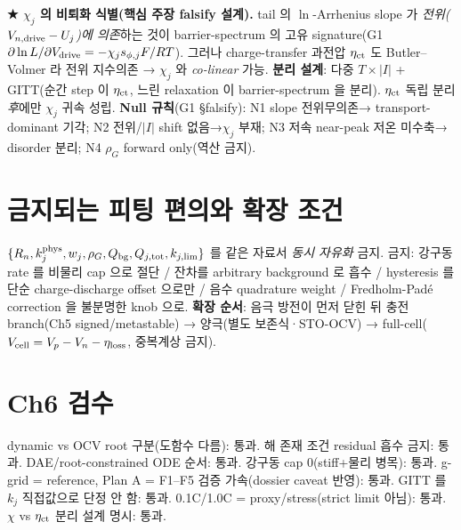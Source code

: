 \textbf{★ $\chi_j$ 의 비퇴화 식별(핵심 주장 falsify 설계).} tail 의 $\ln$-Arrhenius slope 가
\emph{전위($V_{n,\mathrm{drive}}-U_j$)에 의존}하는 것이 barrier-spectrum 의 고유 signature(G1
$\partial\ln L/\partial V_{\mathrm{drive}}=-\chi_j s_{\phi,j}F/RT$). 그러나 charge-transfer 과전압 $\eta_{\mathrm{ct}}$ 도
Butler--Volmer 라 전위 지수의존 → $\chi_j$ 와 \emph{co-linear} 가능. \textbf{분리 설계}: 다중
$T\times|I|$ + GITT(순간 step 이 $\eta_{\mathrm{ct}}$, 느린 relaxation 이 barrier-spectrum 을 분리). $\eta_{\mathrm{ct}}$
독립 분리 \emph{후}에만 $\chi_j$ 귀속 성립. \textbf{Null 규칙}(G1 \S falsify): N1 slope 전위무의존→
transport-dominant 기각; N2 전위/$|I|$ shift 없음→$\chi_j$ 부재; N3 저속 near-peak 저온 미수축→
disorder 분리; N4 $\rho_G$ forward only(역산 금지).

\section{금지되는 피팅 편의와 확장 조건}\label{sec:ch6_forbid}
$\{R_n,k_j^\mathrm{phys},w_j,\rho_G,Q_{\mathrm{bg}},Q_{j,\mathrm{tot}},k_{j,\lim}\}$ 를 같은 자료서 \emph{동시 자유화} 금지.
금지: 강구동 rate 를 비물리 cap 으로 절단 / 잔차를 arbitrary background 로 흡수 / hysteresis 를 단순
charge-discharge offset 으로만 / 음수 quadrature weight / Fredholm-Padé correction 을 불분명한 knob 으로.
\textbf{확장 순서}: 음극 방전이 먼저 닫힌 뒤 충전 branch(Ch5 signed/metastable) → 양극(별도 보존식·STO-OCV)
→ full-cell($V_{\mathrm{cell}}=V_p-V_n-\eta_\mathrm{loss}$, 중복계상 금지).

\section{Ch6 검수}\label{sec:ch6_check}
{\small dynamic vs OCV root 구분(도함수 다름): 통과. 해 존재 조건 residual 흡수 금지: 통과.
DAE/root-constrained ODE 순서: 통과. 강구동 cap 0(stiff+물리 병목): 통과. g-grid = reference,
Plan A = F1--F5 검증 가속(dossier caveat 반영): 통과. GITT 를 $k_j$ 직접값으로 단정 안 함: 통과.
0.1C/1.0C = proxy/stress(strict limit 아님): 통과. $\chi$ vs $\eta_{\mathrm{ct}}$ 분리 설계 명시: 통과.}

